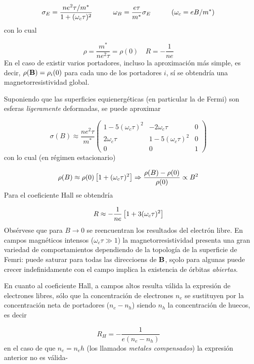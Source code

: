 \begin{equation*}
	\sigma_E = \frac{ne^2 \tau/m^*}{1+(\omega_c\tau)^2} \quad \quad \quad \omega_B = \frac{e\tau}{m^*} \sigma_E  \quad \quad \quad (\omega_c = eB/m^*)
\end{equation*}
con lo cual 

\begin{equation}
	\rho = \frac{m^*}{ne^2\tau} = \rho(0) \quad R=-\frac{1}{ne}
\end{equation}
En el caso de existir varios portadores, incluso la aproximación más simple, es decir, $\rho(\mathbf{B})=\rho_i(0)$ para cada uno de los portadores $i$, sí se obtendría una magnetorresistividad global.

Suponiendo que las superficies equienergéticas (en particular la de Fermi) son esferas \textit{ligeramente} deformadas, se puede aproximar

\begin{equation}
	\sigma (B) \approx \frac{ne^2 \tau}{m^*} \begin{pmatrix}
	1-5 (\omega_c \tau)^2 & -2\omega_c \tau & 0 \\
	2 \omega_c \tau & 1-5(\omega_c \tau)^2 & 0 \\
	0 & 0 & 1
	\end{pmatrix}
\end{equation}
con lo cual (en régimen estacionario)

\begin{equation}
	\rho(B) \approx \rho(0) \left[ 1+(\omega_c \tau)^2 \right] \Rightarrow \frac{\rho(B)-\rho(0)}{\rho(0)} \propto B^2
\end{equation}
Para el coeficiente Hall se obtendría 

\begin{equation}
	R \approx - \frac{1}{ne} \left[ 1+3(\omega_c \tau)^2 \right]
\end{equation}
Obsérvese que para $B\rightarrow 0$ se reencuentran los resultados del electrón libre. En campos magnéticos intensos ($\omega_c \tau \gg 1$) la magnetorresistividad presenta una gran variedad de comportamientos dependiendo de la topología de la superficie de Femri: puede saturar para todas las direccioens de $\mathbf{B}$, sçolo para algunas puede crecer indefinidamente con el campo implica la existencia de órbitas \textit{abiertas}.

En cuanto al coeficiente Hall, a campos altos resulta válida la expresión de electrones libres, sólo que la concentración de electrones $n_e$ se sustituyen por la concentración neta de portadores ($n_e-n_h$) siendo $n_h$ la concentración de huecos, es decir

\begin{equation}
	R_H = - \frac{1}{e(n_e-n_h)}
\end{equation}
en el caso de que $n_e=n_eh$ (los llamados \textit{metales compensados}) la expresión anterior no es válida-